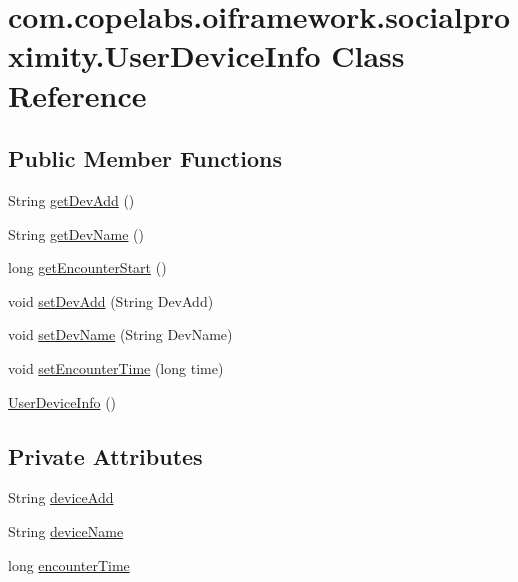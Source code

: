 \hypertarget{classcom_1_1copelabs_1_1oiframework_1_1socialproximity_1_1_user_device_info}{}\section{com.\+copelabs.\+oiframework.\+socialproximity.\+User\+Device\+Info Class Reference}
\label{classcom_1_1copelabs_1_1oiframework_1_1socialproximity_1_1_user_device_info}
\subsection*{Public Member Functions}
\begin{DoxyCompactItemize}
\item 
String \hyperlink{classcom_1_1copelabs_1_1oiframework_1_1socialproximity_1_1_user_device_info_a23595466b852fd2fd321817bc519f93b}{get\+Dev\+Add} ()
\item 
String \hyperlink{classcom_1_1copelabs_1_1oiframework_1_1socialproximity_1_1_user_device_info_ab914ab326e1d21563590da1e3a140ff6}{get\+Dev\+Name} ()
\item 
long \hyperlink{classcom_1_1copelabs_1_1oiframework_1_1socialproximity_1_1_user_device_info_a96793f0b51a54ca18ef2da90b73b3d38}{get\+Encounter\+Start} ()
\item 
void \hyperlink{classcom_1_1copelabs_1_1oiframework_1_1socialproximity_1_1_user_device_info_a97e8f3aa3b0db7f1469db1e6935c7d40}{set\+Dev\+Add} (String Dev\+Add)
\item 
void \hyperlink{classcom_1_1copelabs_1_1oiframework_1_1socialproximity_1_1_user_device_info_a45736ba412a554b644be69f9238b23c4}{set\+Dev\+Name} (String Dev\+Name)
\item 
void \hyperlink{classcom_1_1copelabs_1_1oiframework_1_1socialproximity_1_1_user_device_info_a567200f8205e9b5295726d342be9e78c}{set\+Encounter\+Time} (long time)
\item 
\hyperlink{classcom_1_1copelabs_1_1oiframework_1_1socialproximity_1_1_user_device_info_aaacbd54c4a3be6eb567022ebc924fa31}{User\+Device\+Info} ()
\end{DoxyCompactItemize}
\subsection*{Private Attributes}
\begin{DoxyCompactItemize}
\item 
String \hyperlink{classcom_1_1copelabs_1_1oiframework_1_1socialproximity_1_1_user_device_info_a982ea56c8215d617be03abc51b947f97}{device\+Add}
\item 
String \hyperlink{classcom_1_1copelabs_1_1oiframework_1_1socialproximity_1_1_user_device_info_aba7f9036ed638f139476b79f09387f2d}{device\+Name}
\item 
long \hyperlink{classcom_1_1copelabs_1_1oiframework_1_1socialproximity_1_1_user_device_info_ab80fa8c65b6e2fec9aba0cc25781a881}{encounter\+Time}
\end{DoxyCompactItemize}


